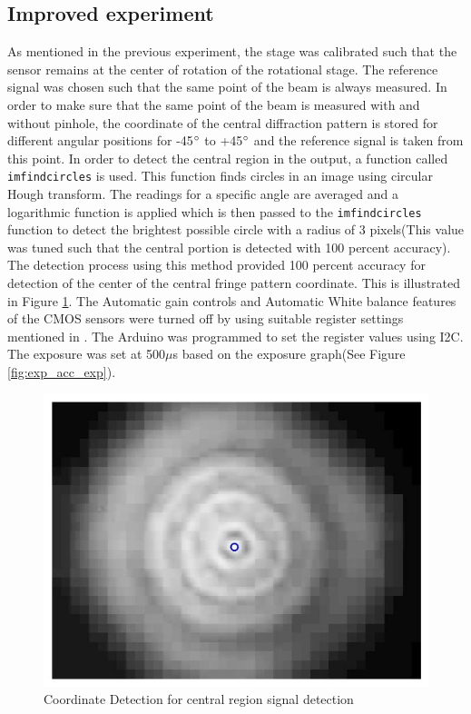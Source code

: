 \subsection{Improved experiment}
As mentioned in the previous experiment, the stage was calibrated such that the sensor remains at the center of rotation of the rotational stage. The reference signal was chosen such that the same point of the beam is always measured. In order to make sure that the same point of the beam is measured with and without pinhole, the coordinate of the central diffraction pattern is stored for different angular positions for -45$\degree$ to +45$\degree$ and the reference signal is taken from this point. In order to detect the central region in the output, a function called \texttt{imfindcircles} is used\cite{imfindcircles}. This function finds circles in an image using circular Hough transform. The readings for a specific angle are averaged and a logarithmic function is applied which is then passed to the \texttt{imfindcircles} function to detect the brightest possible circle with a radius of 3 pixels(This value was tuned such that the central portion is detected with 100 percent accuracy). The detection process using this method provided 100 percent accuracy for detection of the center of the central fringe pattern coordinate. This is illustrated in Figure \ref{fig:center_calib}. The Automatic gain controls and Automatic White balance features of the CMOS sensors were turned off by using suitable register settings mentioned in \cite{OV2640DS}. The Arduino was programmed to set the register values using I2C. The exposure was set at 500$\mu$s based on the exposure graph(See Figure \ref{fig:exp_acc_exp}).
\begin{figure}[!h]
\centering
\includegraphics[scale=0.300]{pics/CentralRegionTracking.jpg}
\caption{Coordinate Detection for central region signal detection}
\label{fig:center_calib}
\end{figure}

